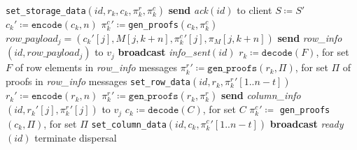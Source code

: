 \documentclass[sigconf,screen]{acmart}
\begin{document}
\begin{algorithm}[t]
\begin{algorithmic}[1]
\small
\caption{Dispersal at node $v_k$ for $id=$\texttt{ID($m$)}. Initially, $S = \bot$.}
    \label{algo:disperse}
\State \texttt{set\_storage\_data}$(id, r_k, c_k, \pi^r_{k}, \pi^c_{k})$
\State \textbf{send} \emph{ack}$(id)$ to client
\EndUpon
{}
\State $S \coloneqq S'$
\EndUpon
{}
\State $c_k' \coloneqq \texttt{encode}(c_k, n)$
\State ${\pi^c_k}' \coloneqq $\texttt{gen\_proofs}$(c_k, {\pi^c_k})$
\State $row\_payload_j = ({c_k}'[j], M[j,k+n], {\pi^c_k}'[j], \pi_M[j,k+n])$
\State \textbf{send} \emph{row\_info}$(id, row\_payload_j)$ to $v_j$
\EndFor
\State \textbf{broadcast} \emph{info\_sent}$(id)$
\EndUpon
{}
\State $r_k \coloneqq \texttt{decode}(F)$, for set $F$ of row elements in \emph{row\_info} messages
\State ${\pi^r_k}' \coloneqq \texttt{gen\_proofs}(r_k,\Pi)$, for set $\Pi$ of proofs in \emph{row\_info} messages
\State \texttt{set\_row\_data}$(id, r_k, {\pi^r_k}'[1..n-t])$
\EndUpon
{}
\State $r_k' \coloneqq \texttt{encode}(r_k, n)$
\State ${\pi^r_k}' \coloneqq \texttt{gen\_proofs}(r_k,\pi^r_k)$
\State \textbf{send} \emph{column\_info}$(id, r_k'[j],{\pi_k^r}'[j])$ to $v_j$
\EndFor
\EndUpon
{}
\State $c_k \coloneqq \texttt{decode}(C)$, for set $C$
\State ${\pi^c_k}' \coloneqq$ \texttt{gen\_proofs}$(c_k, \Pi)$, for set $\Pi$
\State \texttt{set\_column\_data}$(id, c_k, {\pi^c_k}'[1..n-t])$
\EndUpon
{}
\State \textbf{broadcast} \emph{ready}$(id)$
\EndUpon
{}
\State terminate dispersal
\EndUpon
\end{algorithmic}
\end{algorithm}
\end{document}
